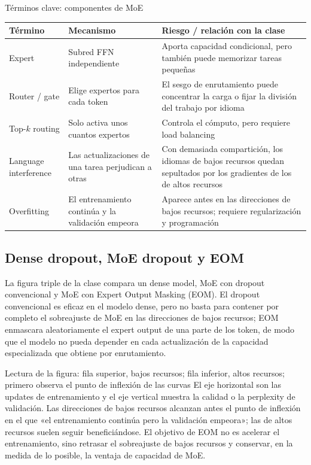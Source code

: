 \begin{knowledgebox}{Términos clave: componentes de MoE}
\begin{tabularx}{\textwidth}{@{}L{0.21\textwidth}L{0.26\textwidth}X@{}}
\toprule
Término & Mecanismo & Riesgo / relación con la clase \\
\midrule
Expert & Subred FFN independiente & Aporta capacidad condicional, pero también puede memorizar tareas pequeñas \\
Router / gate & Elige expertos para cada token & El sesgo de enrutamiento puede concentrar la carga o fijar la división del trabajo por idioma \\
Top-$k$ routing & Solo activa unos cuantos expertos & Controla el cómputo, pero requiere load balancing \\
Language interference & Las actualizaciones de una tarea perjudican a otras & Con demasiada compartición, los idiomas de bajos recursos quedan sepultados por los gradientes de los de altos recursos \\
Overfitting & El entrenamiento continúa y la validación empeora & Aparece antes en las direcciones de bajos recursos; requiere regularización y programación \\
\bottomrule
\end{tabularx}
\end{knowledgebox}

\subsection{Dense dropout, MoE dropout y EOM}

La figura triple de la clase compara un dense model, MoE con dropout convencional y MoE con Expert Output Masking (EOM). El dropout convencional es eficaz en el modelo dense, pero no basta para contener por completo el sobreajuste de MoE en las direcciones de bajos recursos; EOM enmascara aleatoriamente el expert output de una parte de los token, de modo que el modelo no pueda depender en cada actualización de la capacidad especializada que obtiene por enrutamiento.


\begin{knowledgebox}{Lectura de la figura: fila superior, bajos recursos; fila inferior, altos recursos; primero observa el punto de inflexión de las curvas}
El eje horizontal son las updates de entrenamiento y el eje vertical muestra la calidad o la perplexity de validación. Las direcciones de bajos recursos alcanzan antes el punto de inflexión en el que «el entrenamiento continúa pero la validación empeora»; las de altos recursos suelen seguir beneficiándose. El objetivo de EOM no es acelerar el entrenamiento, sino retrasar el sobreajuste de bajos recursos y conservar, en la medida de lo posible, la ventaja de capacidad de MoE.
\end{knowledgebox}

